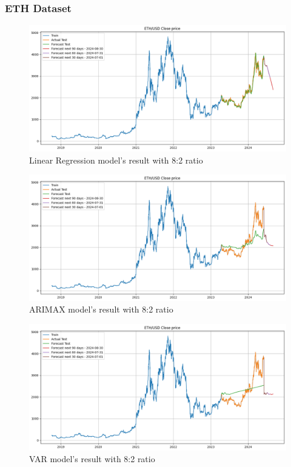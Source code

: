 \documentclass{ieeeojies}
\begin{document}
\subsubsection{ETH Dataset}
\begin{figure}[H]
    \centering
    \includegraphics[width=0.8\linewidth]{./././visualize/LinearRegression/ETH-80-20.png}
    \caption{Linear Regression model’s result with 8:2 ratio}
    \label{fig:21}
\end{figure}
\begin{figure}[H]
    \centering
    \includegraphics[width=0.8\linewidth]{./././visualize/ARIMAX/ETH-80-20.png}
    \caption{ARIMAX model’s result with 8:2 ratio}
    \label{fig:22}
\end{figure}
\begin{figure}[H]
    \centering
    \includegraphics[width=0.8\linewidth]{./././visualize/VAR/ETH-80-20.png}
    \caption{VAR model’s result with 8:2 ratio}
    \label{fig:23}
\end{figure}
\end{document}
